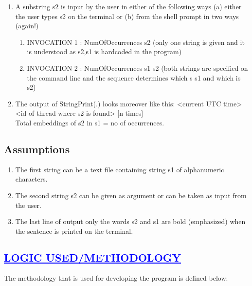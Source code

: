 \documentclass[a4paper,12pt]{report}
\begin{document}
\begin{enumerate}
 \item A substring s2 is input by the user in either of the following ways (a) either the user types s2 on the terminal or (b) from the shell prompt in two ways (again!)
\begin{enumerate}
 \item INVOCATION 1 :  NumOfOccurrences s2 (only one string is given and it is understood as s2,s1 is hardcoded in the program)
  \item INVOCATION 2 :  NumOfOccurrences s1 s2 (both strings are specified on the command line and the sequence determines which s s1 and which is s2)
\end{enumerate}
\item The output of StringPrint(.) looks moreover like this:
<current UTC time> <id of thread where s2 is found> [n times]\\
Total embeddings of s2 in s1 = no of occurrences.


\end{enumerate}


 
\section*{Assumptions}

\begin{enumerate}
 \item  The first string can be a text file containing string s1 of alphanumeric characters.
\item The second string s2 can be given as argument or can be taken as input from the user.
\item The last line of output only the words s2 and s1 are bold (emphasized) when the sentence is printed on the terminal.

\end{enumerate}
 
\begin{center}
\chapter{\textcolor{blue}{\underline {LOGIC USED/METHODOLOGY}}}
\end{center}
The methodology that is used for developing the program is defined below:
\end{document}
